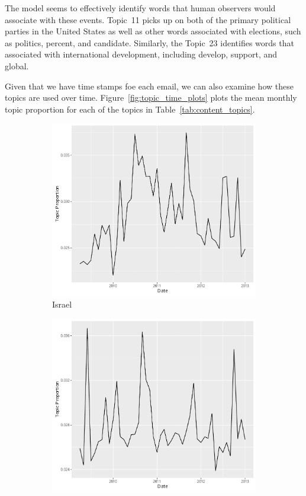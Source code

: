 \documentclass[12pt]{article}
\theoremstyle{definition}
\theoremstyle{algodesc}
\begin{document}
The model seems to effectively identify words that human observers would associate with these events. Topic~11 picks up on both of the primary political parties in the United States as well as other words associated with elections, such as politics, percent, and candidate.  Similarly, the Topic~23 identifies words that associated with international development, including develop, support, and global.

Given that we have time stamps foe each email, we can also examine how these topics are used over time. Figure~\ref{fig:topic_time_plots} plots the mean monthly topic proportion for each of the topics in Table~\ref{tab:content_topics}.

\begin{figure}[htb]
\centering
\begin{subfigure}[Israel]{.30\linewidth}
    \includegraphics[width=\linewidth]{../images/time_plot6.pdf}
    \caption{Israel} \label{fig:t1}
\end{subfigure}
\begin{subfigure}[Election]{.30\linewidth}
    \includegraphics[width=\linewidth]{../images/time_plot11.pdf}

\end{subfigure}
\end{figure}
\end{document}
